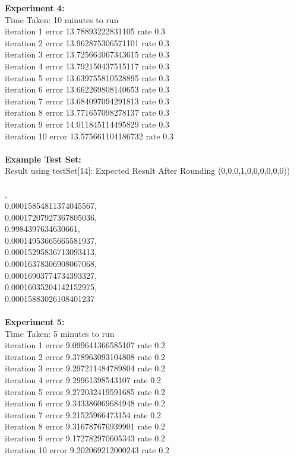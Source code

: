 \documentclass[11pt]{article}
\begin{document}
\begin{page}
\noindent \textbf{Experiment 4:} \\
Time Taken: 10 minutes to run\\

\noindent iteration 1 error 13.78893222831105 rate 0.3\\
iteration 2 error 13.962875306571101 rate 0.3\\
iteration 3 error 13.725664067343615 rate 0.3\\
iteration 4 error 13.792150437515117 rate 0.3\\
iteration 5 error 13.639755810528895 rate 0.3\\
iteration 6 error 13.662269808140653 rate 0.3\\
iteration 7 error 13.684097094291813 rate 0.3\\
iteration 8 error 13.771657098278137 rate 0.3\\
iteration 9 error 14.011845114495829 rate 0.3\\
iteration 10 error 13.575661104186732 rate 0.3\\\\

\noindent \textbf{Example Test Set:}\\
Result using testSet[14]: Expected Result After Rounding (0,0,0,1,0,0,0,0,0,0))\\\\

,\\
  0.00015854811374045567,\\
  0.00017207927367805036,\\
  0.9984397634630661,\\
  0.00014953665665581937,\\
  0.00015295836713093413,\\
  0.00016378306908067068,\\
  0.00016903774734393327,\\
  0.00016035204142152975,\\
  0.00015883026108401237\\
\\
\noindent \textbf{Experiment 5:} \\
Time Taken: 5 minutes to run\\

\noindent iteration 1 error 9.099641366585107 rate 0.2\\
iteration 2 error 9.378963093104808 rate 0.2\\
iteration 3 error 9.297211484789804 rate 0.2\\
iteration 4 error 9.29961398543107 rate 0.2\\
iteration 5 error 9.272032419591685 rate 0.2\\
iteration 6 error 9.343386069684948 rate 0.2\\
iteration 7 error 9.21525966473154 rate 0.2\\
iteration 8 error 9.316787676939901 rate 0.2\\
iteration 9 error 9.172782970605343 rate 0.2\\
iteration 10 error 9.202069212000243 rate 0.2\\\\


\end{page}
\end{document}
